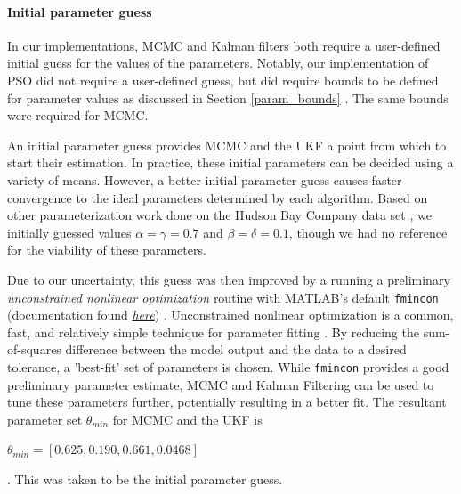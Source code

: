 \paragraph{Initial parameter guess} \label{section:LV_initParams}
In our implementations, MCMC and Kalman filters both require a user-defined initial guess for the values of the parameters. Notably, our implementation of PSO did not require a user-defined guess, but did require bounds to be defined for parameter values as discussed in Section \ref{param_bounds} . The same bounds were required for MCMC.
\par An initial parameter guess provides MCMC and the UKF a point from which to start their estimation. In practice, these initial parameters can be decided using a variety of means. However, a better initial parameter guess causes faster convergence to the ideal parameters determined by each algorithm.
Based on other parameterization work done on the Hudson Bay Company data set \cite{predpreyHudsonBay}, we initially guessed values $\alpha = \gamma = 0.7$ and $\beta = \delta = 0.1$, though we had no reference for the viability of these parameters. 
\par Due to our uncertainty, this guess was then improved by a running a preliminary \emph{unconstrained nonlinear optimization} routine with MATLAB's default \texttt{fmincon} (documentation found \textit{\href{https://www.mathworks.com/help/optim/ug/fmincon.html}{here}}) \cite{MATLAB:2020b}. Unconstrained nonlinear optimization is a common, fast, and relatively simple technique for parameter fitting \cite{Simunek2002nonlinearfitting} \cite{optimizationparamest_ppt}. By reducing the sum-of-squares difference between the model output and the data to a desired tolerance, a 'best-fit' set of parameters is chosen. While \texttt{fmincon} provides a good preliminary parameter estimate, MCMC and Kalman Filtering can be used to tune these parameters further, potentially resulting in a better fit. The resultant parameter set $\theta_{min}$ for MCMC and the UKF is 
\begin{center}
    $\theta_{min} = [0.625, 0.190, 0.661, 0.0468]$
\end{center}. 
This was taken to be the initial parameter guess.

